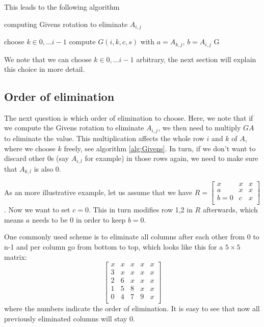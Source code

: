 \documentclass[a4paper]{scrartcl}
\begin{document}
        This leads to the following algorithm
        \begin{algorithm}[H]
            \caption{computing Givens rotation to eliminate $A_{i,j}$}\label{alg:Givens}
            \begin{algorithmic}[1]
                \State choose $k \in {0, \dots i-1}$
                \State compute $G(i,k,c,s)$ with $a=A_{k,j}$, $b=A_{i,j}$ 
                \State \Return G
            \EndProcedure
            \end{algorithmic}
        \end{algorithm}
        We note that we can choose $k\in {0, \dots i-1}$ arbitrary, the next
        section will explain this choice in more detail.


    \subsection{Order of elimination}\label{sub:ElimOrder}
    
    The next question is which order of elimination to choose. Here, we note
    that if we compute the Givens rotation to eliminate $A_{i,j}$, we then need
    to multiply $GA$ to eliminate the value. This multiplication affects the
    whole row $i$ and $k$ of $A$, where we choose $k$ freely, see algorithm
    \ref{alg:Givens}. In turn, if we don't want to discard other 0s (say
    $A_{i,l}$ for example) in those rows again, we need to make sure that
    $A_{k,l}$ is also 0.

    As an more illustrative example, let us assume that we have
    $R= \begin{bmatrix}
        x & x & x \\
        a& x & x \\
        b=0 & c & x \\
    \end{bmatrix}$. Now we want to set $c=0$. This in turn modifies row 1,2 in
    $R$ afterwards, which means $a$ needs to be 0 in order to keep
    $b=0$.

    One commonly used scheme is to eliminate all columns after each other from 0
    to n-1 and per column go from bottom to top, which looks like this for a $5\times 5$ matrix:
    \begin{equation}\label{eq:It_Scheme}
        \begin{bmatrix}
            x & x & x & x & x \\
            3 & x & x & x & x \\
            2 & 6 & x & x & x \\
            1 & 5 & 8 & x & x \\
            0 & 4 & 7 & 9 & x \\
        \end{bmatrix}
    \end{equation}
    where the numbers indicate the order of elimination. It is easy to see that
    now all previously eliminated columns will stay 0.
\end{document}
